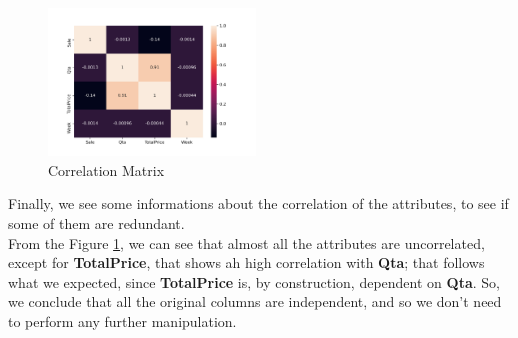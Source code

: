 \begin{figure}
\centering
\includegraphics[width=0.49\textwidth]{img/corr.png}
\caption{Correlation Matrix}
\label{fig:corr}
\end{figure}

Finally, we see some informations about the correlation of the attributes, to see if some of them are redundant.\\
From the Figure \ref{fig:corr}, we can see that almost all the attributes are uncorrelated, except for \textbf{TotalPrice}, that shows ah high correlation with \textbf{Qta}; that follows what we expected, since \textbf{TotalPrice} is, by construction, dependent on \textbf{Qta}. So, we conclude that all the original columns are independent, and so we don't need to perform any further manipulation.

